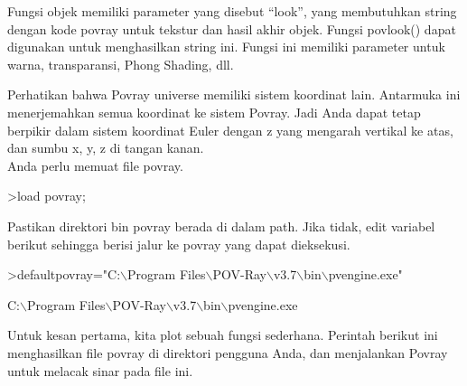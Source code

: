 \documentclass[a4paper,10pt]{article}
\begin{document}
\begin{eulernotebook}
\begin{eulercomment}
\begin{eulercomment}
\begin{eulercomment}
\begin{eulercomment}
\begin{eulercomment}
\begin{eulercomment}
\begin{eulercomment}
\begin{eulercomment}
\begin{eulercomment}
\begin{eulercomment}
\begin{eulercomment}
\begin{eulercomment}
\begin{eulercomment}
\begin{eulercomment}
\begin{eulercomment}
\begin{eulercomment}
\begin{eulercomment}
Fungsi objek memiliki parameter yang disebut “look”, yang membutuhkan
string dengan kode povray untuk tekstur dan hasil akhir objek. Fungsi
povlook() dapat digunakan untuk menghasilkan string ini. Fungsi ini
memiliki parameter untuk warna, transparansi, Phong Shading, dll.

Perhatikan bahwa Povray universe memiliki sistem koordinat lain.
Antarmuka ini menerjemahkan semua koordinat ke sistem Povray. Jadi
Anda dapat tetap berpikir dalam sistem koordinat Euler dengan z yang
mengarah vertikal ke atas, dan sumbu x, y, z di tangan kanan.\\
Anda perlu memuat file povray.
\end{eulercomment}
\begin{eulerprompt}
>load povray;
\end{eulerprompt}
\begin{eulercomment}
Pastikan direktori bin povray berada di dalam path. Jika tidak, edit
variabel berikut sehingga berisi jalur ke povray yang dapat
dieksekusi.
\end{eulercomment}
\begin{eulerprompt}
>defaultpovray="C:\(\backslash\)Program Files\(\backslash\)POV-Ray\(\backslash\)v3.7\(\backslash\)bin\(\backslash\)pvengine.exe"
\end{eulerprompt}
\begin{euleroutput}
  C:\(\backslash\)Program Files\(\backslash\)POV-Ray\(\backslash\)v3.7\(\backslash\)bin\(\backslash\)pvengine.exe
\end{euleroutput}
\begin{eulercomment}
Untuk kesan pertama, kita plot sebuah fungsi sederhana. Perintah
berikut ini menghasilkan file povray di direktori pengguna Anda, dan
menjalankan Povray untuk melacak sinar pada file ini.


\end{eulercomment}
\end{eulercomment}
\end{eulercomment}
\end{eulercomment}
\end{eulercomment}
\end{eulercomment}
\end{eulercomment}
\end{eulercomment}
\end{eulercomment}
\end{eulercomment}
\end{eulercomment}
\end{eulercomment}
\end{eulercomment}
\end{eulercomment}
\end{eulercomment}
\end{eulercomment}
\end{eulercomment}
\end{eulernotebook}
\end{document}
